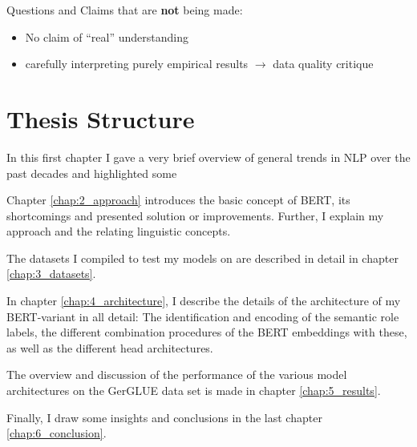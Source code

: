 Questions and Claims that are \textbf{not} being made:

\begin{itemize}
  \item No claim of ``real'' understanding
  \item carefully interpreting purely empirical results $\rightarrow$ data quality critique
\end{itemize}



\section{Thesis Structure}

In this first chapter I gave a very brief overview of general trends in
NLP over the past decades and highlighted some

Chapter \ref{chap:2_approach} introduces the basic concept of BERT,
its {\color{red} shortcomings} and presented solution or improvements. Further,
I explain my approach and the relating linguistic concepts.

The datasets I compiled to test my models on are described in detail
in chapter \ref{chap:3_datasets}.

In chapter \ref{chap:4_architecture}, I describe the details of the architecture of
my BERT-variant in all detail: The identification and encoding of the semantic role
labels, the different combination procedures of the BERT embeddings with these, as
well as the different head architectures.

The overview and discussion of the performance of the various model architectures on
the GerGLUE data set is made in chapter \ref{chap:5_results}.

Finally, I draw some insights and conclusions in the last chapter \ref{chap:6_conclusion}.

